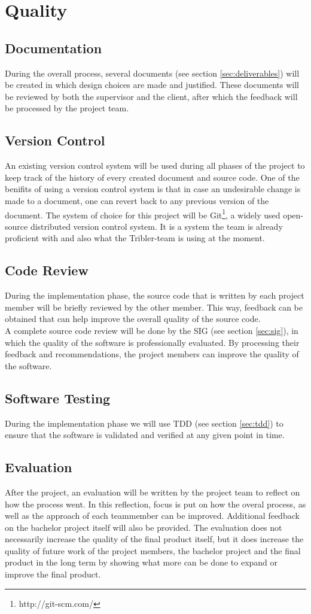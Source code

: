\section{Quality}
\subsection{Documentation}
During the overall process, several documents (see section \ref{sec:deliverables}) will be created in which design choices are made and justified. These documents will be reviewed by both the supervisor and the client, after which the feedback will be processed by the project team. 
\subsection{Version Control}
An existing version control system will be used during all phases of the project to keep track of the history of every created document and source code. One of the benifits of using a version control system is that in case an undesirable change is made to a document, one can revert back to any previous version of the document. The system of choice for this project will be Git\footnote{http://git-scm.com/}, a widely used open-source distributed version control system. It is a system the team is already proficient with and also what the Tribler-team is using at the moment.
\subsection{Code Review}
During the implementation phase, the source code that is written by each project member will be briefly reviewed by the other member. This way, feedback can be obtained that can help improve the overall quality of the source code.\\
A complete source code review will be done by the SIG (see section \ref{sec:sig}), in which the quality of the software is professionally evaluated. By processing their feedback and recommendations, the project members can improve the quality of the software.
\subsection{Software Testing}
During the implementation phase we will use TDD (see section \ref{sec:tdd}) to ensure that the software is validated and verified at any given point in time.
\subsection{Evaluation}
After the project, an evaluation will be written by the project team to reflect on how the process went. In this reflection, focus is put on how the overal process, as well as the approach of each teammember can be improved. Additional feedback on the bachelor project itself will also be provided. The evaluation does not necessarily increase the quality of the final product itself, but it does increase the quality of future work of the project members, the bachelor project and the final product in the long term by showing what more can be done to expand or improve the final product.


